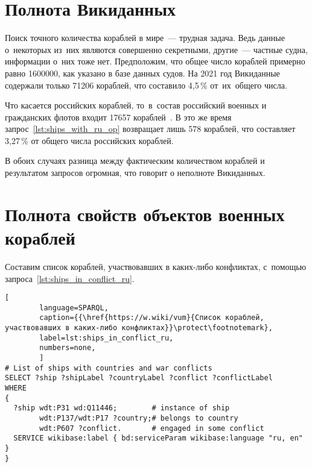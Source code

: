 \newpage
\section{Полнота Викиданных}

Поиск точного количества кораблей в мире~--- трудная задача. 
Ведь данные о~некоторых из~них являются совершенно секретными, 
другие~--- частные судна, информации о~них тоже нет. 
Предположим, что общее число кораблей примерно равно \num{1600000}, 
как указано в базе данных судов. %
На 2021 год Викиданные содержали только 71206 кораблей, 
что составило 4,5\,\% от~их~общего числа.


Что касается российских кораблей, 
то~в~состав российский военных и гражданских флотов входит \num{17657} кораблей~\autocite{RussianShips}. 
В это же время запрос~\ref{lst:ships_with_ru_op} возвращает лишь 578 кораблей, 
что составляет 3,27\,\% от общего числа российских кораблей. 

В обоих случаях разница между фактическим количеством кораблей и результатом запросов огромная, что говорит о неполноте Викиданных.






\section{Полнота свойств объектов военных кораблей}

Составим список кораблей, участвовавших в каких-либо конфликтах, 
с~помощью запроса~\ref{lst:ships_in_conflict_ru}.

\begin{lstlisting}[ 
        language=SPARQL, 
        caption={{\href{https://w.wiki/vum}{Список кораблей, участвовавших в каких-либо конфликтах}}\protect\footnotemark}, 
        label=lst:ships_in_conflict_ru, 
        numbers=none,
        ]
# List of ships with countries and war conflicts
SELECT ?ship ?shipLabel ?countryLabel ?conflict ?conflictLabel
WHERE
{
  ?ship wdt:P31 wd:Q11446;        # instance of ship
        wdt:P137/wdt:P17 ?country;# belongs to country
        wdt:P607 ?conflict.       # engaged in some conflict
  SERVICE wikibase:label { bd:serviceParam wikibase:language "ru, en" }
}
\end{lstlisting}



